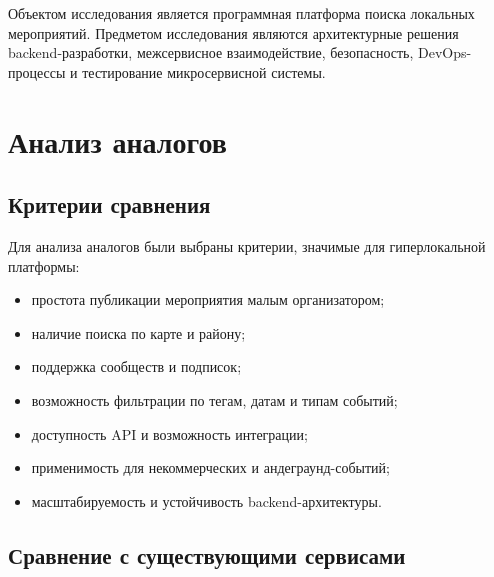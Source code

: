 Объектом исследования является программная платформа поиска локальных мероприятий. Предметом исследования являются архитектурные решения backend-разработки, межсервисное взаимодействие, безопасность, DevOps-процессы и тестирование микросервисной системы.

\section{Анализ аналогов}

\subsection{Критерии сравнения}

Для анализа аналогов были выбраны критерии, значимые для гиперлокальной платформы:
\begin{itemize}
    \item простота публикации мероприятия малым организатором;
    \item наличие поиска по карте и району;
    \item поддержка сообществ и подписок;
    \item возможность фильтрации по тегам, датам и типам событий;
    \item доступность API и возможность интеграции;
    \item применимость для некоммерческих и андеграунд-событий;
    \item масштабируемость и устойчивость backend-архитектуры.
\end{itemize}

\subsection{Сравнение с существующими сервисами}

